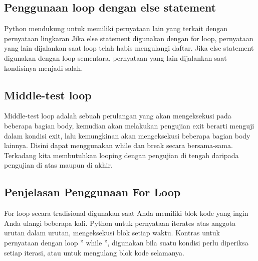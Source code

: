 \subsection{Penggunaan loop dengan else statement}
Python mendukung untuk memiliki pernyataan lain yang terkait dengan pernyataan lingkaran
Jika else statement digunakan dengan for loop, pernyataan yang lain dijalankan saat loop telah habis mengulangi daftar.
Jika else statement digunakan dengan loop sementara, pernyataan yang lain dijalankan saat kondisinya menjadi salah.

\subsection{Middle-test loop}
Middle-test loop adalah sebuah perulangan yang akan mengeksekusi pada beberapa bagian body, kemudian akan melakukan pengujian exit berarti menguji dalam kondisi exit, lalu kemungkinan akan mengeksekusi beberapa bagian body lainnya. Disini dapat menggunakan while dan break secara bersama-sama. Terkadang kita membutuhkan looping dengan pengujian di tengah daripada pengujian di atas maupun di akhir.

\subsection{Penjelasan Penggunaan For Loop}
For loop secara tradisional digunakan saat Anda memiliki blok kode yang ingin Anda ulangi beberapa kali. Python untuk pernyataan iterates atas anggota urutan dalam urutan, mengeksekusi blok setiap waktu. Kontras untuk pernyataan dengan loop '' while '', digunakan bila suatu kondisi perlu diperiksa setiap iterasi, atau untuk mengulang blok kode selamanya.
